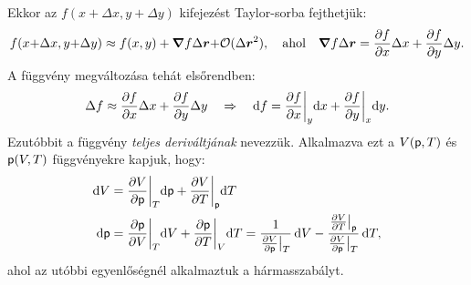 Ekkor az $f(x{+}\Delta x{,}y{+}\Delta y)$ kifejezést Taylor-sorba fejthetjük:
\begin{align}
    f(x{+}\Delta x,y{+}\Delta y)\approx f(x,y) + \bm\nabla f \Delta \bm r{+}\mathcal O(\Delta \bm r^2),\quad \textnormal{ahol}\quad \bm\nabla f \Delta \bm r = \frac{\partial{f}}{\partial{x}}\Delta x+\frac{\partial{f}}{\partial{y}} \Delta y.
\end{align}
A függvény megváltozása tehát elsőrendben:
\begin{align}
    \Delta f\approx \frac{\partial{f}}{\partial{x}}\Delta x+\frac{\partial{f}}{\partial{y}} \Delta y \quad\Rightarrow\quad \mathrm{d}f = \frac{\partial{f}}{\partial{x}}\bigg|_y\mathrm{d} x+\frac{\partial{f}}{\partial{y}}\bigg|_x \mathrm{d} y.
\end{align}
Ezutóbbit a függvény \emph{teljes deriváltjának} nevezzük. Alkalmazva ezt a $V(\mathsf p,T)$ és $\mathsf p(V,T)$ függvényekre kapjuk, hogy:
\begin{align}
    \mathrm{d} V &= \frac{\partial{V}}{\partial{\mathsf p}}\bigg|_T \mathrm{d}\mathsf p + \frac{\partial{V}}{\partial{T}}\bigg|_\mathsf p \mathrm{d}T \\
    \mathrm{d} \mathsf p &= \frac{\partial{\mathsf p}}{\partial{V}}\bigg|_T\mathrm{d}V + \frac{\partial{\mathsf p}}{\partial{T}}\bigg|_V \mathrm{d}T = \frac{1}{\frac{\partial{V}}{\partial{\mathsf p}}\big|_T}\,\mathrm{d} V - \frac{\frac{\partial{V}}{\partial{T}}\big|_\mathsf p}{\frac{\partial{V}}{\partial{\mathsf p}}\big|_T}\,\mathrm{d} T,
\end{align}
ahol az utóbbi egyenlőségnél alkalmaztuk a hármasszabályt.
